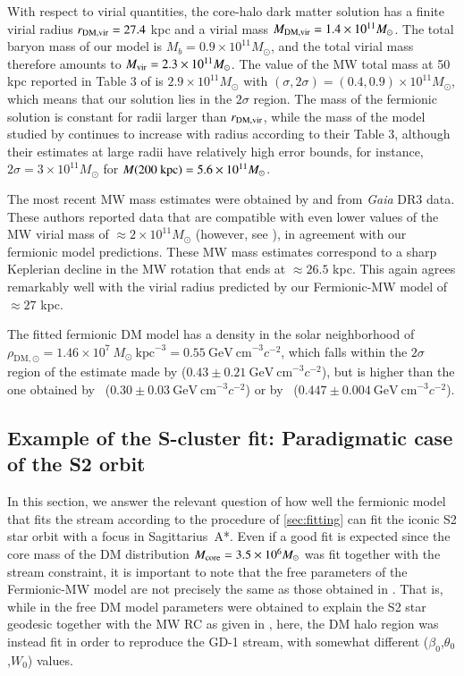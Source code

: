 \documentclass[twocolumn]{aa}
\begin{document}
With respect to virial quantities, the core-halo dark matter solution has a finite virial radius $r_{\rm{DM,vir}}=27.4$ kpc and a virial mass
$M_{\rm{DM,vir}}=1.4\times10^{11} M_\odot$. The total baryon mass of our model is $M_b=0.9\times10^{11}M_\odot$, and the total virial mass therefore amounts to
$M_{\rm{vir}}=2.3\times10^{11} M_\odot$. The value of the MW total mass at 50 kpc reported in Table 3
of \citet{2014MNRAS.445.3788G} is $2.9\times10^{11} M_\odot$ with $(\sigma, 2\sigma)=(0.4,0.9)\times10^{11} M_\odot$, which means that our solution lies in the $2\sigma$ region.
The mass of the fermionic solution is constant for radii larger than
$r_{\rm{DM,vir}}$, while the mass of the model studied by \citet{2014MNRAS.445.3788G} continues to increase with radius according to their Table 3, although their estimates at large radii have relatively
high error bounds, for instance, $2\sigma=3\times10^{11} M_\odot$ for $M(200 \hbox{ kpc}) =5.6\times10^{11} M_\odot$.

The most recent MW mass estimates were obtained by
\citet{Jiao2023} and \citet{Ou2023} from {\it Gaia} DR3 data. These authors reported data that are compatible with even lower values of the MW virial mass of $\approx 2\times10^{11} M_\odot$
(however, see \citealt{2024arXiv240519028K}),
in agreement with our fermionic model predictions. These MW mass estimates correspond to a sharp Keplerian decline in the MW rotation that ends at $\approx 26.5$ kpc. This again agrees remarkably well with the virial radius predicted by our Fermionic-MW model of $\approx 27$ kpc.

The fitted fermionic DM model has a density in the solar neighborhood of
$\rho_{\mathrm{DM},\odot}=1.46\times10^7~M_\odot~\mathrm{kpc}^{-3}=0.55~\mathrm{GeV~cm}^{-3} c^{-2}$, which falls within the $2\sigma$ region of the estimate made by \citealt{Salucci2010} ($0.43\pm 0.21~\mathrm{GeV~cm}^{-3} c^{-2}$),
but is higher than the one obtained by~\citealt{Eilers_2019} ($0.30\pm0.03~\mathrm{GeV~cm}^{-3} c^{-2}$) or by~\citealt{Ou_2024MNRAS} ($0.447\pm0.004~\mathrm{GeV~cm}^{-3} c^{-2}$).

\subsection{Example of the S-cluster fit: Paradigmatic case of the S2 orbit}
In this section, we answer the relevant question of how well the fermionic model that fits the stream according to the procedure of \cref{sec:fitting} can fit the iconic S2 star orbit with a focus in Sagittarius~A*. Even if a good fit is expected since the core mass of the DM distribution $M_{\rm{core}}=3.5\times 10^6 M_\odot$ was fit together with the stream constraint, it is important to note that the free parameters of the Fermionic-MW model are not precisely the same as those obtained in \cite{2020A&A...641A..34B}. That is, while in \cite{2020A&A...641A..34B} the free DM model parameters were obtained to explain the S2 star geodesic together with the MW RC as given in \cite{sofue_rotation_2013}, here, the DM halo region was instead fit in order to reproduce the GD-1 stream, with somewhat different ($\beta_0$,$\theta_0$,$W_0$) values.
\end{document}
